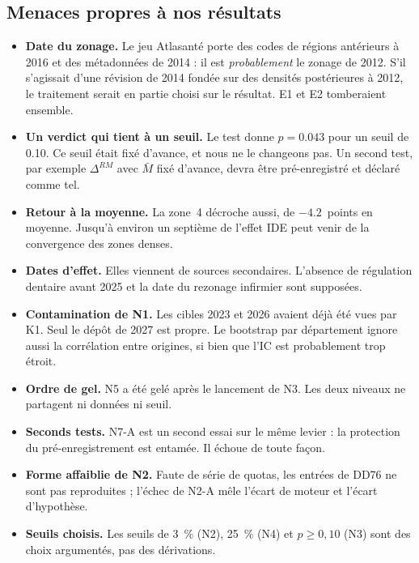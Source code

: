 \subsection{Menaces propres à nos résultats}
\begin{itemize}
  \item \textbf{Date du zonage.} Le jeu Atlasanté porte des codes de régions antérieurs à 2016 et
        des métadonnées de 2014 : il est \emph{probablement} le zonage de 2012. S'il s'agissait
        d'une révision de 2014 fondée sur des densités postérieures à 2012, le traitement serait en
        partie choisi sur le résultat. E1 et E2 tomberaient ensemble.
  \item \textbf{Un verdict qui tient à un seuil.} Le test donne $p = \num{0.043}$ pour un seuil de
        \num{0.10}. Ce seuil était fixé d'avance, et nous ne le changeons pas. Un second test, par
        exemple $\Delta^{RM}$ avec $\bar M$ fixé d'avance, devra être pré-enregistré et déclaré
        comme tel.
  \item \textbf{Retour à la moyenne.} La zone~4 décroche aussi, de $-\num{4.2}$\mesure{}~points en
        moyenne. Jusqu'à environ un septième\derive{} de l'effet IDE peut venir de la convergence
        des zones denses.
  \item \textbf{Dates d'effet.} Elles viennent de sources secondaires. L'absence de régulation
        dentaire avant 2025 et la date du rezonage infirmier sont supposées.
  \item \textbf{Contamination de N1.} Les cibles 2023 et 2026 avaient déjà été vues par K1. Seul le
        dépôt de 2027 est propre. Le bootstrap par département ignore aussi la corrélation entre
        origines, si bien que l'IC est probablement trop étroit\suppose{}.
  \item \textbf{Ordre de gel.} N5 a été gelé après le lancement de N3. Les deux niveaux ne partagent
        ni données ni seuil.
  \item \textbf{Seconds tests.} N7-A est un second essai sur le même levier : la protection du
        pré-enregistrement est entamée. Il échoue de toute façon.
  \item \textbf{Forme affaiblie de N2.} Faute de série de quotas, les entrées de DD76 ne sont pas
        reproduites ; l'échec de N2-A mêle l'écart de moteur et l'écart d'hypothèse.
  \item \textbf{Seuils choisis.} Les seuils de 3~\% (N2), 25~\% (N4) et $p \ge 0{,}10$ (N3) sont des
        choix argumentés, pas des dérivations.
\end{itemize}

